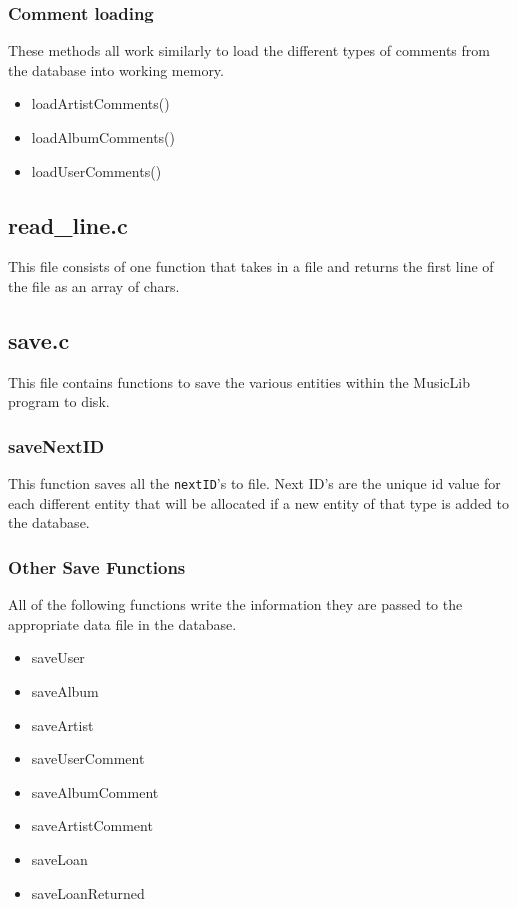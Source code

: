 \documentclass{article}
\begin{document}
\subsubsection*{Comment loading}
These methods all work similarly to load the different types of comments from the database into working memory.
\begin{itemize}
\item{loadArtistComments()}
\item{loadAlbumComments()}
\item{loadUserComments()}
\end{itemize}

\subsection{read\_line.c}
This file consists of one function that takes in a file and returns the first line of the file as an array of chars.

\subsection{save.c}
This file contains functions to save the various entities within the MusicLib program to disk.

\subsubsection*{saveNextID}
This function saves all the \verb|nextID|'s to file. Next ID's are the unique id value for each different entity that will be allocated if a new entity of that type is added to the database.

\subsubsection*{Other Save Functions}
All of the following functions write the information they are passed to the appropriate data file in the database.
\begin{itemize}
\item{saveUser}
\item{saveAlbum}
\item{saveArtist}
\item{saveUserComment}
\item{saveAlbumComment}
\item{saveArtistComment}
\item{saveLoan}
\item{saveLoanReturned}
\end{itemize}
\end{document}
